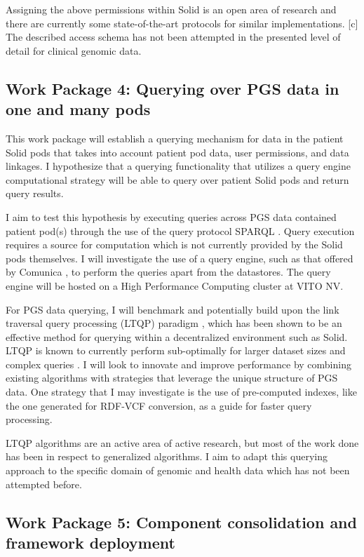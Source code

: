 \documentclass[runningheads]{llncs}
\begin{document}
Assigning the above permissions within Solid is an open area of research and there are currently some state-of-the-art protocols for similar implementations. [c]
The described access schema has not been attempted in the presented level of detail for clinical genomic data.


\subsection{Work Package 4: Querying over PGS data in one and many pods}

This work package will establish a querying mechanism for data in the patient Solid pods that takes into account patient pod data, user permissions, and data linkages. 
I hypothesize that a querying functionality that utilizes a query engine computational strategy will be able to query over patient Solid pods and return query results.

I aim to test this hypothesis by executing queries across PGS data contained patient pod(s) through the use of the query protocol SPARQL \cite{sparql}.
Query execution requires a source for computation which is not currently provided by the Solid pods themselves.
I will investigate the use of a query engine, such as that offered by Comunica \cite{comunica}, to perform the queries apart from the datastores.
The query engine will be hosted on a High Performance Computing cluster at VITO NV.

For PGS data querying, I will benchmark and potentially build upon the link traversal query processing (LTQP) paradigm \cite{taelman_evaluation_2023}, which has been shown to be an effective method for querying within a decentralized environment such as Solid. 
LTQP is known to currently perform sub-optimally for larger dataset sizes and complex queries \cite{taelman_evaluation_2023}. 
I will look to innovate and improve performance by combining existing algorithms with strategies that leverage the unique structure of PGS data.
One strategy that I may investigate is the use of pre-computed indexes, like the one generated for RDF-VCF conversion, as a guide for faster query processing.

LTQP algorithms are an active area of active research, but most of the work done has been in respect to generalized algorithms.
I aim to adapt this querying approach to the specific domain of genomic and health data which has not been attempted before. 

\subsection{Work Package 5: Component consolidation and framework deployment}
\end{document}
